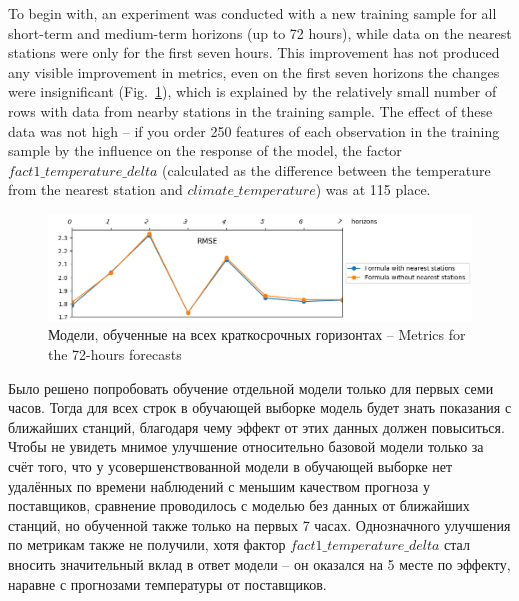 \documentclass[14pt]{matmex-diploma}
\begin{document}
To begin with, an experiment was conducted with a new training sample for all short-term and medium-term horizons (up to 72 hours), while data on the nearest stations were only for the first seven hours. This improvement has not produced any visible improvement in metrics, even on the first seven horizons the changes were insignificant (Fig.~\ref{pic1_metrics_initial}), which is explained by the relatively small number of rows with data from nearby stations in the training sample. The effect of these data was not high -- if you order 250 features of each observation in the training sample by the influence on the response of the model, the factor $fact1\_temperature\_delta$ (calculated as the difference between the temperature from the nearest station and $climate\_temperature$) was at 115 place.

\begin{figure}
\centering
\includegraphics[width=\linewidth]{images/pic1_metrics_initial.png}
\caption{Модели, обученные на всех краткосрочных горизонтах -- Metrics for the 72-hours forecasts}
\label{pic1_metrics_initial}
\end{figure}


Было решено попробовать обучение отдельной модели только для первых семи часов. Тогда для всех строк в обучающей выборке модель будет знать показания с ближайших станций, благодаря чему эффект от этих данных должен повыситься. Чтобы не увидеть мнимое улучшение относительно базовой модели только за счёт того, что у усовершенствованной модели в обучающей выборке нет удалённых по времени наблюдений с меньшим качеством прогноза у поставщиков, сравнение проводилось с моделью без данных от ближайших станций, но обученной также только на первых 7 часах. Однозначного улучшения по метрикам также не получили, хотя фактор $fact1\_temperature\_delta$ стал вносить значительный вклад в ответ модели -- он оказался на 5 месте по эффекту, наравне с прогнозами температуры от поставщиков.
\end{document}
